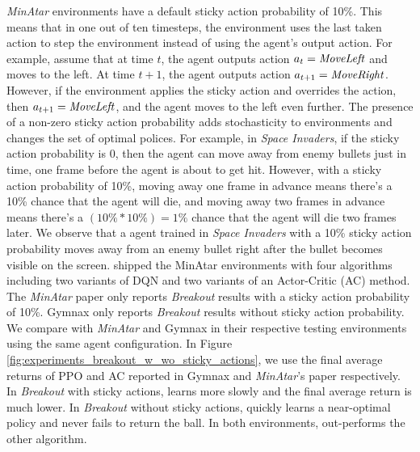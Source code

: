 \textit{MinAtar} environments have a default sticky action probability of 10\%.
This means that in one out of ten timesteps, the environment uses the last taken action to step the environment instead of using the agent's output action.
For example, assume that at time $t$, the agent outputs action $a_t = \text{\textit{MoveLeft}}$ and moves to the left.
At time $t+1$, the agent outputs action $a_{t+1} = \text{\textit{MoveRight}}$.
However, if the environment applies the sticky action and overrides the action, then $a_{t+1} = \text{\textit{MoveLeft}}$, and the agent moves to the left even further.
The presence of a non-zero sticky action probability adds stochasticity to environments and changes the set of optimal polices.
For example, in \textit{Space Invaders}, if the sticky action probability is 0, then the agent can move away from enemy bullets just in time, one frame before the agent is about to get hit.
However, with a sticky action probability of 10\%, moving away one frame in advance means there's a 10\% chance that the agent will die, and moving away two frames in advance means there's a $(10\% * 10\%) = 1\%$ chance that the agent will die two frames later.
We observe that a \moozi agent trained in \textit{Space Invaders} with a 10\% sticky action probability moves away from an enemy bullet right after the bullet becomes visible on the screen.
\citeauthor{MinAtarAtariInspiredTestbed_Young.Tian_2019} shipped the MinAtar environments with four algorithms including two variants of DQN and two variants of an Actor-Critic (AC) method.
The \textit{MinAtar} paper \cite{MinAtarAtariInspiredTestbed_Young.Tian_2019} only reports \textit{Breakout} results with a sticky action probability of 10\%.
Gymnax only reports \textit{Breakout} results without sticky action probability.
We compare with \textit{MinAtar} and Gymnax in their respective testing environments using the same \moozi agent configuration.
In Figure \ref{fig:experiments_breakout_w_wo_sticky_actions}, we use the final average returns of PPO and AC reported in Gymnax and \textit{MinAtar}'s paper respectively.
In \textit{Breakout} with sticky actions, \moozi learns more slowly and the final average return is much lower.
In \textit{Breakout} without sticky actions, \moozi quickly learns a near-optimal policy and never fails to return the ball.
In both environments, \moozi out-performs the other algorithm.
